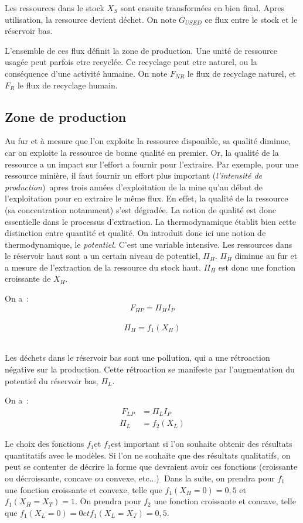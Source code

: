 \documentclass[12pt,a4paper]{article}%
\begin{document}
Les ressources dans le stock $X_{S}$ sont ensuite transformées en bien final.
Apres utilisation, la ressource devient déchet. On note $G_{USED}$ ce flux
entre le stock et le réservoir bas.

L'ensemble de ces flux définit la zone de production. Une unité de ressource
usagée peut parfois etre recyclée. Ce recyclage peut etre naturel, ou la
conséquence d'une activité humaine. On note $F_{NR}$ le flux de recyclage
naturel, et $F_{R}$ le flux de recyclage humain.

\subsection{Zone de production}

Au fur et à mesure que l'on exploite la ressource disponible, sa qualité
diminue, car on exploite la ressource de bonne qualité en premier. Or, la
qualité de la ressource a un impact sur l'effort a fournir pour l'extraire.
Par exemple, pour une ressource minière, il faut fournir un effort plus
important (\textit{l'intensité de production})\textit{\ }apres trois années
d'exploitation de la mine qu'au début de l'exploitation pour en extraire le
même flux. En effet, la qualité de la ressource (sa concentration notamment)
s'est dégradée. La notion de qualité est donc essentielle dans le processus
d'extraction. La thermodynamique établit bien cette distinction entre quantité
et qualité. On introduit donc ici une notion de thermodynamique, le
\textit{potentiel. }C'est une variable intensive. Les ressources dans le
réservoir haut sont a un certain niveau de potentiel, $\Pi_{H}$. $\Pi_{H}$
diminue au fur et a mesure de l'extraction de la ressource du stock haut.
$\Pi_{H}$ est donc une fonction croissante de $X_{H}$.

On a~:%
\[
F_{HP}=\Pi_{H}I_{P}%
\]
\ \ \ \ \ \ \ \ \ \ \ \ \ \ \ \ \ \ \ \ \ \ \ \ \ \ \ \ \ \ \ \ \ \ \ \ \ \ \ \ \
\[
\Pi_{H}=f_{1}(X_{H})
\]
\ \ \ \ \ \ \ \ \ \ \ \ \ \ \ \ \ \ \ \ 

Les déchets dans le réservoir bas sont une pollution, qui a une rétroaction
négative sur la production. Cette rétroaction se manifeste par l'augmentation
du potentiel du réservoir bas, $\Pi_{L}$.

On a~:\ \ \ \ \ \ \ \ \ \ \ \ \ \ \ \ \ \ \
\begin{align*}
\ F_{LP}  &  =\Pi_{L}I_{P}\\
\Pi_{L}  &  =f_{2}(X_{L})
\end{align*}


Le choix des fonctions $f_{1}$et $f_{2}$est important si l'on souhaite obtenir
des résultats quantitatifs avec le modèles. Si l'on ne souhaite que des
résultats qualitatifs, on peut se contenter de décrire la forme que devraient
avoir ces fonctions (croissante ou décroissante, concave ou convexe,
etc...)$_{.}$ Dans la suite, on prendra pour $f_{1}$ une fonction croissante
et convexe, telle que $f_{1}(X_{H}=0)=0,5$ et $f_{1}(X_{H}=X_{T})=1$. On
prendra pour $f_{2}$ une fonction croissante et concave, telle que
$f_{1}(X_{L}=0)=0etf_{1}(X_{L}=X_{T})=0,5$.
\end{document}
